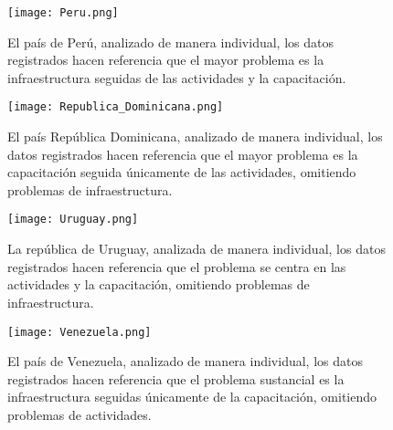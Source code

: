 \documentclass{article}
\begin{document}
\begin{figure}[ht]
    \centering
    \texttt{[image: Peru.png]}
    \caption{El país de Perú, analizado de manera individual, los datos registrados hacen referencia que el mayor problema es la infraestructura seguidas de las actividades y la capacitación.}
    \label{fig:peru}
\end{figure}

\begin{figure}[ht]
    \centering
    \texttt{[image: Republica\_Dominicana.png]}
    \caption{El país República Dominicana, analizado de manera individual, los datos registrados hacen referencia que el mayor problema es la capacitación seguida únicamente de las actividades, omitiendo problemas de infraestructura.}
    \label{fig:costa_rica}
    \label{fig:republica_dominicana}
\end{figure}

\begin{figure}[ht]
    \centering
    \texttt{[image: Uruguay.png]}
    \caption{La república de Uruguay, analizada de manera individual, los datos registrados hacen referencia que el problema se centra en las actividades y la capacitación, omitiendo problemas de infraestructura.}
    \label{fig:uruguay}
\end{figure}

\begin{figure}[ht]
    \centering
    \texttt{[image: Venezuela.png]}
    \caption{El país de Venezuela, analizado de manera individual, los datos registrados hacen referencia que el problema sustancial es la infraestructura seguidas únicamente de la capacitación, omitiendo problemas de actividades.}
    \label{fig:venezuela}
\end{figure}
\clearpage


\end{document}

